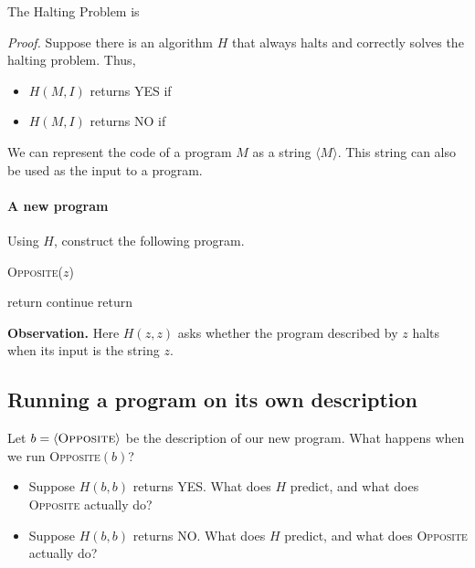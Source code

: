 \documentclass[11  pt]{article}
\begin{document}
\newpage

\begin{theorem} The Halting Problem is 
\end{theorem}

\textit{Proof.} Suppose there is an algorithm $H$ that always halts and correctly solves the halting problem. Thus,
\begin{itemize}
    \item $H(M,I)$ returns YES if 
    \item $H(M,I)$ returns NO if 
\end{itemize}

We can represent the code of a program $M$ as a string $\langle M\rangle$. This string can also be used as the input to a program.

\paragraph{A new program}
Using $H$, construct the following program.
\begin{algorithm}[h]
    \textsc{Opposite}($z$)
    \begin{algorithmic}
            \State return
        \EndIf
                \State continue
            \EndWhile
        \Else
            \State return
        \EndIf
    \end{algorithmic}
\end{algorithm}

\textbf{Observation.} Here $H(z,z)$ asks whether the program described by $z$ halts when its input is the string $z$.

\newpage
\subsection*{Running a program on its own description}
Let $b=\langle\textsc{Opposite}\rangle$ be the description of our new program. What happens when we run \textsc{Opposite}$(b)$?

\begin{itemize}
    \item Suppose $H(b,b)$ returns YES. What does $H$ predict, and what does \textsc{Opposite} actually do?
    \vs{2cm}
    \item Suppose $H(b,b)$ returns NO. What does $H$ predict, and what does \textsc{Opposite} actually do?
    \vs{2cm}
\end{itemize}
\end{document}
